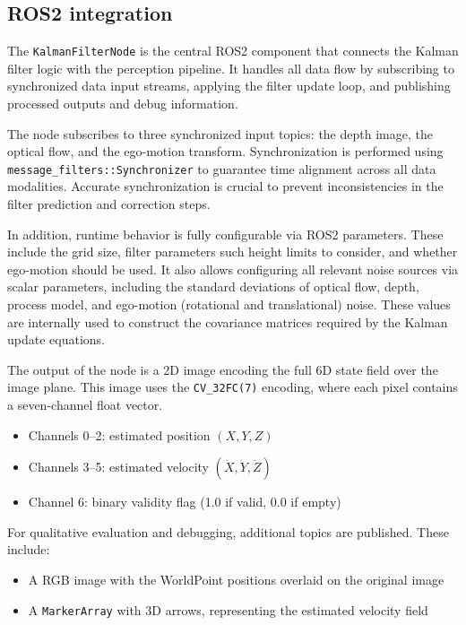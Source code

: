\subsection{ROS2 integration}\label{sec:ROS2IntegrationKalmanFilter}

The \texttt{KalmanFilterNode} is the central ROS2 component that connects the Kalman 
filter logic with the perception pipeline. It handles all data flow by subscribing to 
synchronized data input streams, applying the filter update loop, and publishing processed 
outputs and debug information.

The node subscribes to three synchronized input topics: the depth image, the optical 
flow, and the ego-motion transform. Synchronization is performed using 
\texttt{message\_filters::Synchronizer} to guarantee time alignment across all data 
modalities. Accurate synchronization is crucial to prevent inconsistencies in the filter 
prediction and correction steps.

In addition, runtime behavior is fully configurable via ROS2 parameters. These include the grid 
size, filter parameters such height limits to consider, and whether ego-motion should be used. 
It also allows configuring all relevant noise sources via scalar parameters, 
including the standard deviations of optical flow, depth, process model, and ego-motion 
(rotational and translational) noise. These values are internally used to construct the 
covariance matrices required by the Kalman update equations.

The output of the node is a 2D image encoding the full 6D state field over the image 
plane. This image uses the \texttt{CV\_32FC(7)} encoding, where each pixel contains a 
seven-channel float vector.
\begin{itemize}
  \item Channels 0--2: estimated position \( (X, Y, Z) \)
  \item Channels 3--5: estimated velocity \( (\dot{X}, \dot{Y}, \dot{Z}) \)
  \item Channel 6: binary validity flag (1.0 if valid, 0.0 if empty)
\end{itemize}

For qualitative evaluation and debugging, additional topics are published. 
These include:

\begin{itemize}
  \item A RGB image with the WorldPoint positions overlaid on the original image
  \item A \texttt{MarkerArray} with 3D arrows, representing the estimated velocity field
\end{itemize}

